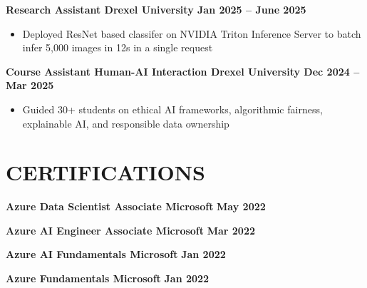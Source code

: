 \documentclass[10pt]{article}
\begin{document}
\noindent
\textbf{Research Assistant \textbar{} Drexel University \hfill Jan 2025 -- June 2025} \\
\vspace{-0.4cm}
\begin{itemize}[leftmargin=0.6cm, itemsep=-0.1cm, topsep=0cm]

    \item Deployed ResNet based classifer on NVIDIA Triton Inference Server to batch infer 5,000 images in 12s in a single request

\end{itemize}

\noindent
\textbf{Course Assistant \textbar{} Human-AI Interaction \textbar{} Drexel University  \hfill Dec 2024 -- Mar 2025} \\
\vspace{-0.4cm}
\begin{itemize}[leftmargin=0.6cm, itemsep=-0.1cm, topsep=0cm]

    \item Guided 30+ students on ethical AI frameworks, algorithmic fairness, explainable AI, and responsible data ownership

\end{itemize}



\vspace{-0.4cm} 
\section*{CERTIFICATIONS} 
\vspace{-0.2cm}

\noindent
\textbf{Azure Data Scientist Associate \textbar{} Microsoft } \hfill \textbf{May 2022 }

\noindent
\textbf{Azure AI Engineer Associate \textbar{} Microsoft } \hfill \textbf{Mar 2022 }

\noindent
\textbf{Azure AI Fundamentals \textbar{} Microsoft } \hfill \textbf{Jan 2022 }

\noindent
\textbf{Azure Fundamentals \textbar{} Microsoft } \hfill \textbf{Jan 2022 }
\end{document}
